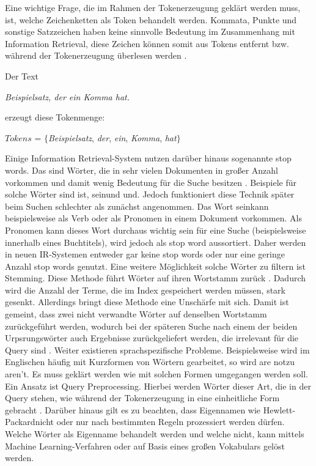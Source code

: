 Eine wichtige Frage, die im Rahmen der Tokenerzeugung geklärt werden muss, ist, welche Zeichenketten als Token behandelt werden. Kommata, Punkte und sonstige Satzzeichen haben keine sinnvolle Bedeutung im Zusammenhang mit Information Retrieval, diese Zeichen können somit aus Tokens entfernt bzw. während der Tokenerzeugung überlesen werden \cite{IR_Intro_Cambridge}.

Der Text
\begin{center}
	\textit{Beispielsatz, der ein Komma hat.}
\end{center}
erzeugt diese Tokenmenge:
\begin{center}
	$Tokens$ = $\{$\textit{Beispielsatz}, \textit{der}, \textit{ein}, \textit{Komma}, \textit{hat}$\}$
\end{center}

Einige Information Retrieval-System nutzen darüber hinaus sogenannte \glqq stop words\grqq. Das sind Wörter, die in sehr vielen Dokumenten in großer Anzahl vorkommen und damit wenig Bedeutung für die Suche besitzen \cite{IR_Intro_Cambridge}. Beispiele für solche Wörter sind \glqq ist\grqq, \glqq sein\grqq und \glqq und\grqq. Jedoch funktioniert diese Technik später beim Suchen schlechter als zunächst angenommen. Das Wort \glqq sein\grqq kann beispielsweise als Verb oder als Pronomen in einem Dokument vorkommen. Als Pronomen kann dieses Wort durchaus wichtig sein für eine Suche (beispielsweise innerhalb eines Buchtitels), wird jedoch als stop word aussortiert. Daher werden in neuen IR-Systemen entweder gar keine stop words oder nur eine geringe Anzahl stop words genutzt.
\newline
Eine weitere Möglichkeit solche Wörter zu filtern ist Stemming.
Diese Methode führt Wörter auf ihren Wortstamm zurück \cite{IR_Intro_Cambridge} \cite{IR_Uni_Bamberg}. Dadurch wird die Anzahl der Terme, die im Index gespeichert werden müssen, stark gesenkt. Allerdings bringt diese Methode eine Unschärfe mit sich. Damit ist gemeint, dass zwei nicht verwandte Wörter auf denselben Wortstamm zurückgeführt werden, wodurch bei der späteren Suche nach einem der beiden Urpsrungswörter auch Ergebnisse zurückgeliefert werden, die irrelevant für die Query sind \cite{IR_Intro_Cambridge}.
\newpage
Weiter existieren sprachspezifische Probleme. Beispielsweise wird im Englischen häufig mit Kurzformen von Wörtern gearbeitet, so wird \glqq are not\grqq zu \glqq aren't\grqq. Es muss geklärt werden wie mit solchen Formen umgegangen werden soll. Ein Ansatz ist Query Preprocessing. Hierbei werden Wörter dieser Art, die in der Query stehen, wie während der Tokenerzeugung in eine einheitliche Form gebracht \cite{IR_Intro_Cambridge}. Darüber hinaus gilt es zu beachten, dass Eigennamen wie \glqq Hewlett-Packard\grqq nicht oder nur nach bestimmten Regeln prozessiert werden dürfen. Welche Wörter als Eigenname behandelt werden und welche nicht, kann mittels Machine Learning-Verfahren oder auf Basis eines großen Vokabulars gelöst werden.
\newline

